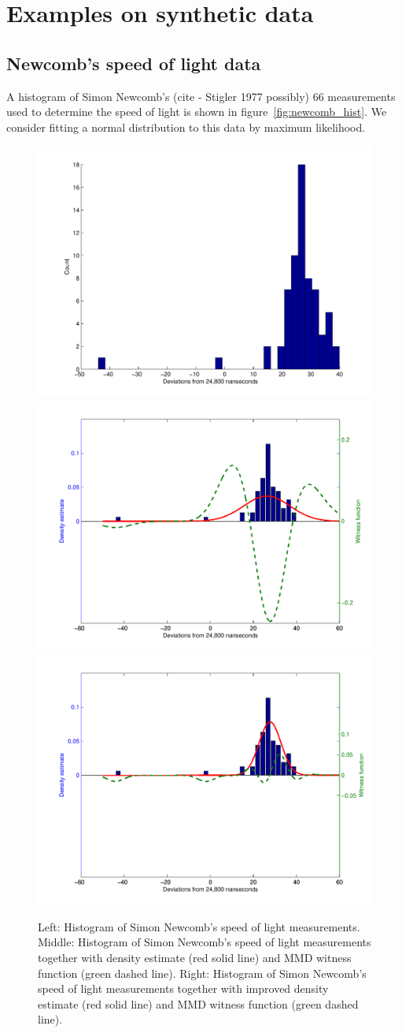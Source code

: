 \documentclass{article} %
\begin{document}
\section{Examples on synthetic data}

\subsection{Newcomb's speed of light data}


A histogram of Simon Newcomb's (cite - Stigler 1977 possibly) 66 measurements used to determine the speed of light is shown in figure~\ref{fig:newcomb_hist}.
We consider fitting a normal distribution to this data by maximum likelihood\footnotemark.

\begin{figure}[ht]
\centering
\includegraphics[width=0.32\columnwidth]{figures/newcomb_hist}
\includegraphics[width=0.32\columnwidth]{figures/newcomb_witness_1}
\includegraphics[width=0.32\columnwidth]{figures/newcomb_witness_2}
\caption{
Left: Histogram of Simon Newcomb's speed of light measurements.
Middle: Histogram of Simon Newcomb's speed of light measurements together with density estimate (red solid line) and MMD witness function (green dashed line).
Right: Histogram of Simon Newcomb's speed of light measurements together with improved density estimate (red solid line) and MMD witness function (green dashed line).
}
\label{fig:newcomb}
\end{figure}
\end{document}
